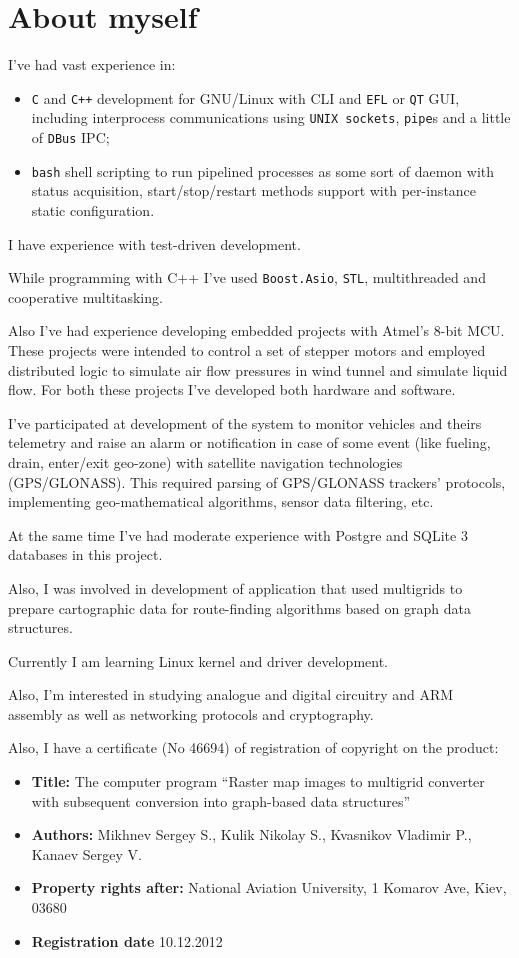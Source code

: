\documentclass[11pt,a4paper,russian]{moderncv}
\begin{document}
\section{About myself}
\par{I've had vast experience in:}
\begin{itemize}
\item \texttt{C} and \texttt{C++} development for GNU/Linux with CLI and \texttt{EFL} or \texttt{QT} GUI, including interprocess communications using \texttt{UNIX sockets}, \texttt{pipe}s and a little of \texttt{DBus} IPC;
\item \texttt{bash} shell scripting to run pipelined processes as some sort of daemon with status acquisition, start/stop/restart methods support with per-instance static configuration.
\end{itemize}
\par{I have experience with test-driven development.}
\par{While programming with C++ I've used \texttt{Boost.Asio}, \texttt{STL}, multithreaded and cooperative multitasking.}
\par{Also I've had experience developing embedded projects with Atmel's 8-bit MCU. These projects were intended to control a set of stepper motors and employed distributed logic to simulate air flow pressures in wind tunnel and simulate liquid flow. For both these projects I've developed both hardware and software.}
\par{I've participated at development of the system to monitor vehicles and theirs telemetry and raise an alarm or notification in case of some event (like fueling, drain, enter/exit geo-zone) with satellite navigation technologies (GPS/GLONASS). This required parsing of GPS/GLONASS trackers' protocols, implementing geo-mathematical algorithms, sensor data filtering, etc.}
\par{At the same time I've had moderate experience with Postgre and SQLite 3 databases in this project.}
\par{Also, I was involved in development of application that used multigrids to prepare cartographic data for route-finding algorithms based on graph data structures.}
\par{Currently I am learning Linux kernel and driver development.}
\par{Also, I'm interested in studying analogue and digital circuitry and ARM assembly as well as networking protocols and cryptography.}
\par{Also, I have a certificate (No 46694) of registration of copyright on the product:
\begin{itemize}
\item \textbf{Title:} The computer program ``Raster map images to multigrid converter with subsequent conversion into graph-based data structures''
\item \textbf{Authors:} Mikhnev Sergey S., Kulik Nikolay S., Kvasnikov Vladimir P., Kanaev Sergey V.
\item \textbf{Property rights after:} National Aviation University, 1 Komarov Ave, Kiev, 03680
\item \textbf{Registration date} 10.12.2012
\end{itemize}}

\clearpage
\end{document}
